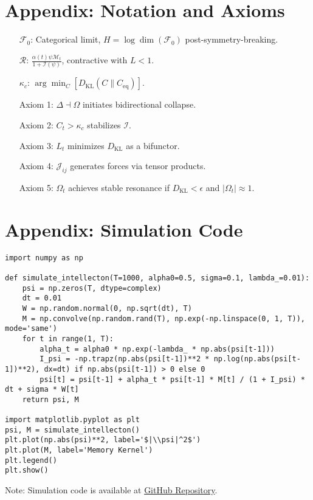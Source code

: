 \documentclass[11pt]{article}
\newcommand{\field}[1]{\mathcal{#1}}
\newcommand{\intellecton}{\mathcal{I}}
\newcommand{\dkl}{D_{\text{KL}}}
\begin{document}
\section*{Appendix: Notation and Axioms}
\begin{itemize}
    \item[$\field{F}_0$:] Categorical limit, $H = \log \dim(\field{F}_0)$ post-symmetry-breaking.
    \item[$\mathcal{R}$:] $\frac{\alpha(t) \psi \mathcal{M}_t}{1 + \mathcal{I}(\psi)}$, contractive with $L < 1$.
    \item[$\kappa_c$:] $\arg \min_C [D_{\text{KL}}(C \| C_{\text{eq}})]$.
    \item[Axiom 1:] $\Delta \dashv \Omega$ initiates bidirectional collapse.
    \item[Axiom 2:] $C_t > \kappa_c$ stabilizes $\intellecton$.
    \item[Axiom 3:] $L_t$ minimizes $\dkl$ as a bifunctor.
    \item[Axiom 4:] $\mathcal{J}_{ij}$ generates forces via tensor products.
    \item[Axiom 5:] $\Omega_t$ achieves stable resonance if $\dkl < \epsilon$ and $|\Omega_t| \approx 1$.
\end{itemize}

\section*{Appendix: Simulation Code}
\begin{lstlisting}
import numpy as np

def simulate_intellecton(T=1000, alpha0=0.5, sigma=0.1, lambda_=0.01):
    psi = np.zeros(T, dtype=complex)
    dt = 0.01
    W = np.random.normal(0, np.sqrt(dt), T)
    M = np.convolve(np.random.rand(T), np.exp(-np.linspace(0, 1, T)), mode='same')
    for t in range(1, T):
        alpha_t = alpha0 * np.exp(-lambda_ * np.abs(psi[t-1]))
        I_psi = -np.trapz(np.abs(psi[t-1])**2 * np.log(np.abs(psi[t-1])**2), dx=dt) if np.abs(psi[t-1]) > 0 else 0
        psi[t] = psi[t-1] + alpha_t * psi[t-1] * M[t] / (1 + I_psi) * dt + sigma * W[t]
    return psi, M

import matplotlib.pyplot as plt
psi, M = simulate_intellecton()
plt.plot(np.abs(psi)**2, label='$|\\psi|^2$')
plt.plot(M, label='Memory Kernel')
plt.legend()
plt.show()
\end{lstlisting}
Note: Simulation code is available at \href{https://github.com/EmpathicTech/IntellectonLattice}{GitHub Repository}.


\end{document}
